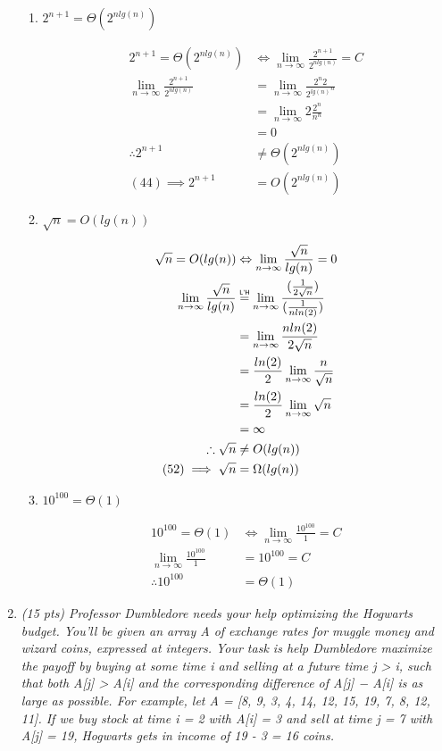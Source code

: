 \documentclass[12pt]{article}
\newcommand\lhop{\mathrel{\overset{\makebox[0pt]{\mbox{\normalfont\tiny\sffamily L'H}}}{=}}}
\newcommand\lmni{\lim_{n\to\infty}}
\begin{document}
\begin{enumerate}
\begin{enumerate}
		\item \textit{$2^{n+1} = \Theta(2^{nlg(n)})$}
		
		\begin{align}
		 2^{n+1} = \Theta(2^{nlg(n)}) & \Leftrightarrow \lmni \frac{2^{n+1}}{2^{nlg(n)}} = C \\
		 \lmni \frac{2^{n+1}}{2^{nlg(n)}} & = \lmni \frac{2^n2}{{2^{lg(n)}}^n} \\
		 & = \lmni 2\frac{2^n}{n^n} \\
		 & = 0\\
		 \therefore 2^{n+1} & \neq \Theta(2^{nlg(n)}) \\
		 (44) \implies 2^{n+1} & = O(2^{nlg(n)})
		\end{align}

		\pagebreak

		\item \textit{$\sqrt{n} = O(lg(n))$}
		
		\begin{align}
		 \sqrt{n} = O(lg(n)) & \Leftrightarrow \lmni \frac{\sqrt{n}}{lg(n)} = 0 \\
		 \lmni \frac{\sqrt{n}}{lg(n)} & \lhop \lmni \frac{(\frac{1}{2\sqrt{n}})}{(\frac{1}{nln(2)})} \\
		 & = \lmni \frac{nln(2)}{2\sqrt{n}} \\
		 & = \frac{ln(2)}{2} \lmni \frac{n}{\sqrt{n}} \\
		 & = \frac{ln(2)}{2} \lmni \sqrt{n} \\
		 & = \infty \\
		 \therefore \sqrt{n} & \neq O(lg(n)) \\
		 (52) \implies \sqrt{n} & = \Omega(lg(n)) 
		\end{align}


		\item \textit{$10^{100} = \Theta(1)$}
		
		\begin{align}
		 10^{100} = \Theta(1) & \Leftrightarrow \lmni \frac{10^{100}}{1} = C \\
		 \lmni \frac{10^{100}}{1} & = 10^{100} = C \\
		 \therefore 10^{100} & = \Theta(1)
		\end{align}
	
	\end{enumerate}

	\newpage
	
	\item	\textit{(15 pts) Professor Dumbledore needs your help optimizing the Hogwarts budget. You’ll
be given an array A of exchange rates for muggle money and wizard coins, expressed
at integers. Your task is help Dumbledore maximize the payoff by buying at some time
i and selling at a future time j > i, such that both A[j] > A[i] and the corresponding
difference of A[j] − A[i] is as large as possible.
For example, let A = [8, 9, 3, 4, 14, 12, 15, 19, 7, 8, 12, 11]. If we buy stock at time i = 2
with A[i] = 3 and sell at time j = 7 with A[j] = 19, Hogwarts gets in income of
19 - 3 = 16 coins.}


\end{enumerate}
\end{document}
